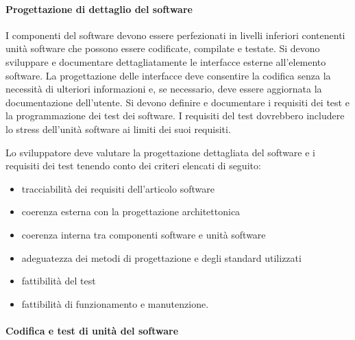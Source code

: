 \documentclass[../../norme-di-progetto.tex]{subfiles}
\begin{document}
\paragraph{Progettazione di dettaglio del software}%
\label{par:progettazione_di_dettaglio_del_software}

I componenti del software devono essere perfezionati in livelli inferiori contenenti unità software che possono essere codificate, compilate e testate. Si devono sviluppare e documentare dettagliatamente le interfacce esterne all'elemento software. La progettazione delle interfacce deve consentire la codifica senza la necessità di ulteriori informazioni e, se necessario, deve essere aggiornata la documentazione dell'utente. Si devono definire e documentare i requisiti dei test e la programmazione dei test dei software. I requisiti del test dovrebbero includere lo stress dell'unità software ai limiti dei suoi requisiti.

Lo sviluppatore deve valutare la progettazione dettagliata del software e i requisiti dei test tenendo conto dei criteri elencati di seguito:

\begin{itemize}
  \item tracciabilità dei requisiti dell'articolo software
  \item coerenza esterna con la progettazione architettonica
  \item coerenza interna tra componenti software e unità software
  \item adeguatezza dei metodi di progettazione e degli standard utilizzati
  \item fattibilità del test
  \item fattibilità di funzionamento e manutenzione.
\end{itemize}


\paragraph{Codifica e test di unità del software}%
\label{par:codifica_e_test_di_unita_del_software}
\end{document}
